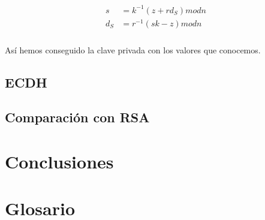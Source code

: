 \documentclass[11pt]{article}
\begin{document}
\begin{align}
\begin{split}
\textit{s} &= \textit{$k^{-1}$}(\textit{z} + \textit{r$d_S$}) mod \textit{n}\\
\textit{$d_S$} &= \textit{$r^{-1}$}(\textit{sk} - \textit{z}) mod \textit{n}\\
\end{split}
\end{align}

Así hemos conseguido la clave privada con los valores que conocemos.

\subsection{ECDH}

\subsection{Comparación con RSA}

\section{Conclusiones}




\appendix
\renewcommand{\thesection}{\Roman{section}}
\setcounter{section}{0}
\section{Glosario}
\end{document}
